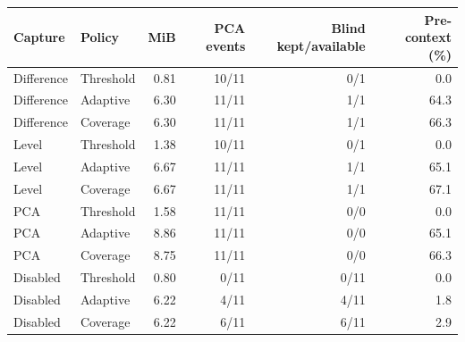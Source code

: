 \begin{tabular}{llrrrr}
\toprule
Capture & Policy & MiB & PCA events & Blind kept/available & Pre-context (\%) \\
\midrule
Difference & Threshold & 0.81 & 10/11 & 0/1 & 0.0 \\
Difference & Adaptive & 6.30 & 11/11 & 1/1 & 64.3 \\
Difference & Coverage & 6.30 & 11/11 & 1/1 & 66.3 \\
Level & Threshold & 1.38 & 10/11 & 0/1 & 0.0 \\
Level & Adaptive & 6.67 & 11/11 & 1/1 & 65.1 \\
Level & Coverage & 6.67 & 11/11 & 1/1 & 67.1 \\
PCA & Threshold & 1.58 & 11/11 & 0/0 & 0.0 \\
PCA & Adaptive & 8.86 & 11/11 & 0/0 & 65.1 \\
PCA & Coverage & 8.75 & 11/11 & 0/0 & 66.3 \\
Disabled & Threshold & 0.80 & 0/11 & 0/11 & 0.0 \\
Disabled & Adaptive & 6.22 & 4/11 & 4/11 & 1.8 \\
Disabled & Coverage & 6.22 & 6/11 & 6/11 & 2.9 \\
\bottomrule
\end{tabular}
